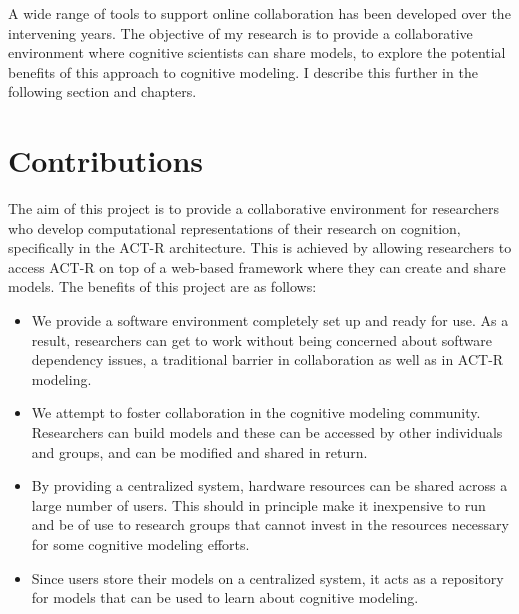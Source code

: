 A wide range of tools to support online collaboration has been
developed over the intervening years.
%
%
The objective of my research is to provide a collaborative environment
where cognitive scientists can share models, to explore the potential
benefits of this approach to cognitive modeling.  I describe this
further in the following section and chapters.

\section{Contributions}

The aim of this project is to provide a collaborative environment for
researchers who develop computational representations of their
research on cognition, specifically in the ACT-R architecture.  This
is achieved by allowing researchers to access ACT-R on top of a
web-based framework where they can create and share models.  The
benefits of this project are as follows:

\begin{itemize}
\item We provide a software environment completely set up and ready
  for use. As a result, researchers can get to work without being
  concerned about software dependency issues, a traditional barrier in
  collaboration as well as in ACT-R modeling.
\item We attempt to foster collaboration in the cognitive modeling
  community. Researchers can build models and these can be accessed by
  other individuals and groups, and can be modified and shared in
  return.
\item By providing a centralized system, hardware resources can be
  shared across a large number of users. This should in principle make
  it inexpensive to run and be of use to research groups that cannot
  invest in the resources necessary for some cognitive modeling efforts.
\item Since users store their models on a centralized system, it acts
  as a repository for models that can be used to learn about cognitive
  modeling.
\end{itemize}


